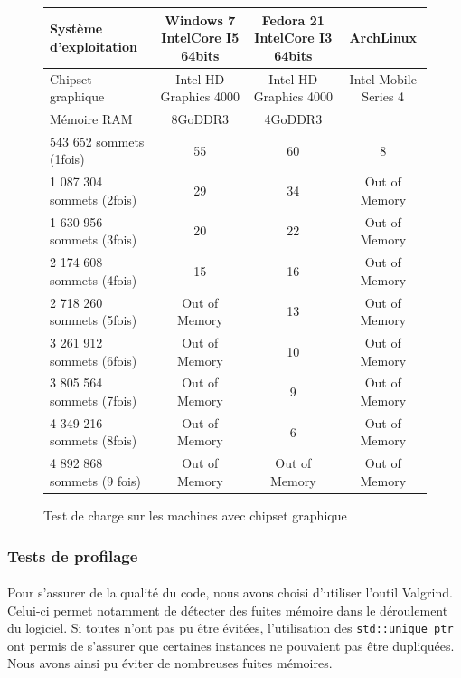 \begin{figure}[h]
  \begin{changemargin}{-4cm}{-4cm}
    \centering
    \begin{tabular}{|l|c|c|c|}
      \hline
      Système d'exploitation & Windows 7 IntelCore I5 64bits & Fedora 21 IntelCore I3 64bits & ArchLinux\\ \hline
      Chipset graphique &  Intel HD Graphics 4000 & Intel HD Graphics 4000 & Intel Mobile Series 4 \\ \hline
      Mémoire RAM & 8GoDDR3 & 4GoDDR3 & \\ \hline \hline
      543 652 sommets (1fois) & 55 & 60 & 8\\ \hline
      1 087 304 sommets (2fois) & 29 & 34 & Out of Memory\\ \hline
      1 630 956 sommets (3fois) & 20 & 22 & Out of Memory \\ \hline
      2 174 608 sommets (4fois) & 15 & 16 & Out of Memory \\ \hline
      2 718 260 sommets (5fois) & Out of Memory & 13 & Out of Memory \\ \hline
      3 261 912 sommets (6fois) & Out of Memory & 10 & Out of Memory \\ \hline
      3 805 564 sommets (7fois) & Out of Memory & 9 & Out of Memory \\ \hline
      4 349 216 sommets (8fois) & Out of Memory & 6 & Out of Memory \\ \hline
      4 892 868 sommets (9 fois) & Out of Memory & Out of Memory & Out of Memory \\ \hline
    \end{tabular}
  \end{changemargin}
  \caption{Test de charge sur les machines avec chipset graphique}
  \label{tab:fps_chip}
\end{figure}

\subsubsection{Tests de profilage}
\paragraph{}
Pour s'assurer de la qualité du code, nous avons choisi d'utiliser l'outil Valgrind. Celui-ci permet notamment de détecter des fuites mémoire dans le déroulement du logiciel. Si toutes n'ont pas pu être évitées, l'utilisation des \texttt{std::unique\_ptr} ont permis de s'assurer que certaines instances ne pouvaient pas être dupliquées. Nous avons ainsi pu éviter de nombreuses fuites mémoires.


